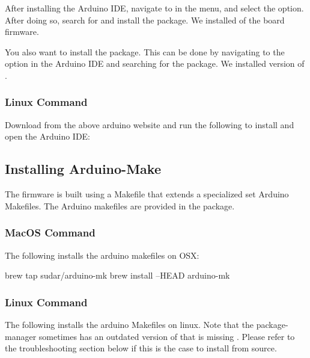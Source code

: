 After installing the Arduino IDE, navigate to  in the menu, and select the 
option. After doing so, search for  and install the  package. We installed  of the
   board firmware.

You also want to install the  package. This can be done by navigating to the 
 option in the Arduino IDE and
searching for the  package. We installed version  of .

\subsubsection{Linux Command}

Download  from the above arduino website and run the following to install and open the Arduino IDE:


\subsection{Installing Arduino-Make}
The firmware is built using a Makefile that extends a specialized set Arduino
Makefiles. The Arduino makefiles are provided in the  package.

\subsubsection{MacOS Command}
The following installs the arduino makefiles on OSX:

\begin{snippet}
brew tap sudar/arduino-mk
brew install --HEAD arduino-mk
\end{snippet}

\subsubsection{Linux Command}
The following installs the arduino Makefiles on linux. Note that the package-manager sometimes has an outdated version of  that is missing . Please refer to the troubleshooting section below if this is the case to install from source.


